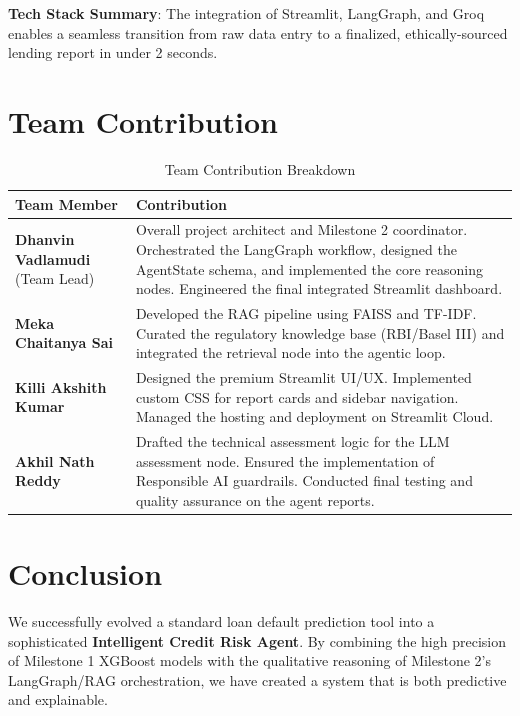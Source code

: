 \documentclass[12pt, a4paper]{article}
\begin{document}
\textbf{Tech Stack Summary}: The integration of Streamlit, LangGraph, and Groq enables a seamless transition from raw data entry to a finalized, ethically-sourced lending report in under 2 seconds.

\section{Team Contribution}

\begin{table}[H]
  \centering
  \caption{Team Contribution Breakdown}
  \begin{tabular}{l p{9cm}}
    \toprule
    \textbf{Team Member} & \textbf{Contribution} \\
    \midrule
    \rowcolor{blue!5} \textbf{Dhanvin Vadlamudi} (Team Lead)
  & Overall project architect and Milestone 2 coordinator. Orchestrated the LangGraph workflow, designed the AgentState schema, and implemented the core reasoning nodes. Engineered the final integrated Streamlit dashboard. \\
    \addlinespace
    \textbf{Meka Chaitanya Sai}
      & Developed the RAG pipeline using FAISS and TF-IDF. Curated the regulatory knowledge base (RBI/Basel III) and integrated the retrieval node into the agentic loop. \\
    \addlinespace
    \rowcolor{blue!5} \textbf{Killi Akshith Kumar}
      & Designed the premium Streamlit UI/UX. Implemented custom CSS for report cards and sidebar navigation. Managed the hosting and deployment on Streamlit Cloud. \\
    \addlinespace
    \textbf{Akhil Nath Reddy}
      & Drafted the technical assessment logic for the LLM assessment node. Ensured the implementation of Responsible AI guardrails. Conducted final testing and quality assurance on the agent reports. \\
    \bottomrule
  \end{tabular}
\end{table}

\section{Conclusion}

We successfully evolved a standard loan default prediction tool into a sophisticated \textbf{Intelligent Credit Risk Agent}. By combining the high precision of Milestone 1 XGBoost models with the qualitative reasoning of Milestone 2's LangGraph/RAG orchestration, we have created a system that is both predictive and explainable.
\end{document}
